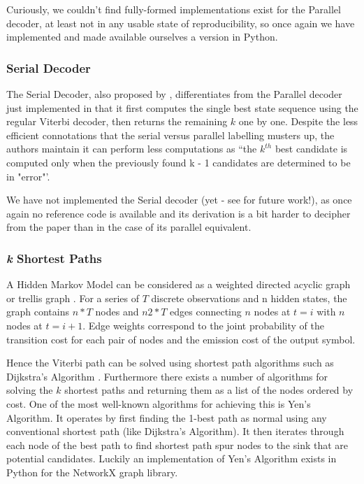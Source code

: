 {{{{{{{Curiously, we couldn't find fully-formed implementations exist for the Parallel decoder, at least not in any usable state of reproducibility, so once again we have implemented and made available ourselves a version in Python. 

\subsubsection{Serial Decoder}

The Serial Decoder, also proposed by \cite{Seshadri1994}, differentiates from the Parallel decoder just implemented in that it first computes the single best state sequence using the regular Viterbi decoder, then returns the remaining $k$ one by one. Despite the less efficient connotations that the serial versus parallel labelling musters up, the authors maintain it can perform less computations as ``the $k^{th}$ best candidate is computed only when the previously found k - 1 candidates are determined to be in "error"'.

We have not implemented the Serial decoder (yet - see  for future work!), as once again no reference code is available and its derivation is a bit harder to decipher from the paper than in the case of its parallel equivalent. 


\subsubsection{\textit{k} Shortest Paths}

A Hidden Markov Model can be considered as a weighted directed acyclic graph or trellis graph . For a series of $T$ discrete observations and n hidden states, the graph contains $n*T$ nodes and $n2*T$ edges connecting $n$ nodes at $t=i$ with $n$ nodes at $t=i+1$. Edge weights correspond to the joint probability of the transition cost for each pair of nodes and the emission cost of the output symbol.

Hence the Viterbi path can be solved using shortest path algorithms such as Dijkstra’s Algorithm \citep{Russell2002}. Furthermore there exists a number of algorithms for solving the $k$ shortest paths and returning them as a list of the nodes ordered by cost. One of the most well-known algorithms for achieving this is Yen’s Algorithm. It operates by first finding the 1-best path as normal using any conventional shortest path (like Dijkstra's Algorithm). It then iterates through each node of the best path to find shortest path spur nodes to the sink that are potential candidates. Luckily an implementation of Yen's Algorithm exists in Python for the NetworkX \cite{Hagberg2008} graph library. 

}}}}}}}
